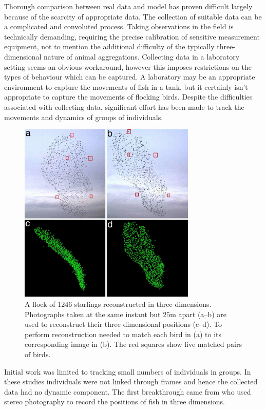 Thorough comparison between real data and model has proven difficult largely because of the scarcity 
of appropriate data. The collection of suitable data can be a complicated and convoluted process. 
Taking observations in the field is technically demanding, requiring the precise calibration of 
sensitive measurement equipment, not to mention the additional difficulty of the typically 
three-dimensional nature of animal aggregations. Collecting data in a laboratory setting seems an 
obvious workaround, however this imposes restrictions on the types of behaviour which can be 
captured. A laboratory may be an appropriate environment to capture the movements of fish in a tank, 
but it certainly isn't appropriate to capture the movements of flocking birds. Despite the 
difficulties associated with collecting data, significant effort has been made to track the movements 
and dynamics of groups of individuals.

\begin{figure}[t]
	\includegraphics[width=0.75\textwidth]{ballerini_starlings.jpg}
	\caption{A flock of 1246 starlings reconstructed in three dimensions. Photographs taken at the same 
instant but $25$m apart (a--b) are used to reconstruct their three dimensional positions (c--d). To 
perform reconstruction \textcite{ballerini08} needed to match each bird in (a) to its corresponding 
image in (b). The red squares show five matched pairs of birds.}
	\label{fig:ballerini}
\end{figure}

Initial work was limited to tracking small numbers of individuals in groups. In these studies 
individuals were not linked through frames and hence the collected data had no dynamic component. The 
first breakthrough came from \textcite{cullen65} who used stereo photography to record the positions 
of fish in three dimensions.

